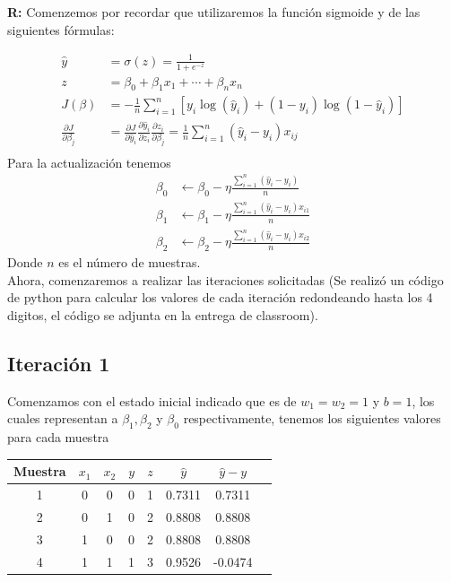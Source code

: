 \textbf{R:} Comenzemos por recordar que utilizaremos la función sigmoide y de las siguientes fórmulas:

\begin{align*}
    \hat{y} &= \sigma(z) = \frac{1}{1 + e^{-z}}\\
    z &= \beta_0 + \beta_1 x_1 + \cdots + \beta_n x_n \\
    J(\beta) &= -\frac{1}{n} \sum_{i=1}^n \left[ y_i \log(\hat{y}_i) + (1-y_i) \log(1-\hat{y}_i) \right]\\
    \frac{\partial J}{\partial \beta_j} &= 
    \frac{\partial J}{\partial \hat{y}_i} 
    \frac{\partial \hat{y}_i}{\partial z_i} 
    \frac{\partial z_i}{\partial \beta_j}  
    =\frac{1}{n} \sum_{i=1}^n (\hat{y}_i - y_i)x_{ij} \\
\end{align*}
Para la actualización tenemos
\begin{align*}
    \beta_0 &\gets \beta_0 - \eta \frac{\sum_{i=1}^n (\hat{y}_i - y_i)}{n} \\
    \beta_1 &\gets \beta_1 - \eta \frac{\sum_{i=1}^n (\hat{y}_i - y_i)x_{i1}}{n} \\
    \beta_2 &\gets \beta_2 - \eta \frac{\sum_{i=1}^n (\hat{y}_i - y_i)x_{i2}}{n}
\end{align*}
Donde $n$ es el número de muestras.\\
Ahora, comenzaremos a realizar las iteraciones solicitadas (Se realizó un código de python para calcular los valores de cada iteración redondeando hasta los 4 digitos, el código se adjunta en la entrega de classroom).
\newpage
\subsection*{Iteración 1}
Comenzamos con el estado inicial indicado que es de $w_1 = w_2 = 1$ y $b=1$, los cuales representan a $\beta_1, \beta_2$ y $\beta_0$ respectivamente, tenemos los siguientes valores para cada muestra
\begin{center}
    \begin{tabular}{c||c|c|c|c|c|c|c}
        Muestra &$x_1$ & $x_2$ & $y$ & $z$ & $\hat{y}$ & $\hat{y} - y$ \\
        \hline
        1&0 & 0 & 0 & 1 & 0.7311 & 0.7311 \\
        2&0 & 1 & 0 & 2 & 0.8808 & 0.8808 \\
        3&1 & 0 & 0 & 2 & 0.8808 & 0.8808 \\
        4&1 & 1 & 1 & 3 & 0.9526 & -0.0474
    \end{tabular}
\end{center}

